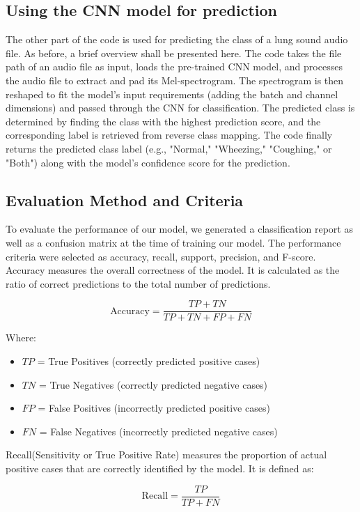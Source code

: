 \documentclass[conference]{IEEEtran}
\begin{document}
{\subsection{Using the CNN model for prediction}
The other part of the code is used for predicting the class of a lung sound audio file. As before, a brief overview shall be presented here.
The code takes the file path of an audio file as input, loads the pre-trained CNN model, and processes the audio file to extract and pad its Mel-spectrogram.
The spectrogram is then reshaped to fit the model's input requirements (adding the batch and channel dimensions) and passed through the CNN for classification.
The predicted class is determined by finding the class with the highest prediction score, and the corresponding label is retrieved from reverse class mapping.
The code finally returns the predicted class label (e.g., "Normal," "Wheezing," "Coughing," or "Both") along with the model's confidence score for the prediction.


\subsection{Evaluation Method and Criteria}
To evaluate the performance of our model, we generated a classification report as well as a confusion matrix at the time of training our model.
The performance criteria were selected as accuracy, recall, support, precision, and F-score.
Accuracy measures the overall correctness of the model. It is calculated as the ratio of correct predictions to the total number of predictions.

\[
\text{Accuracy} = \frac{TP + TN}{TP + TN + FP + FN}
\]

Where:
\begin{itemize}
    \item \( TP \) = True Positives (correctly predicted positive cases)
    \item \( TN \) = True Negatives (correctly predicted negative cases)
    \item \( FP \) = False Positives (incorrectly predicted positive cases)
    \item \( FN \) = False Negatives (incorrectly predicted negative cases)
\end{itemize}

Recall(Sensitivity or True Positive Rate) measures the proportion of actual positive cases that are correctly identified by the model. It is defined as:

\[
\text{Recall} = \frac{TP}{TP + FN}
\]

}
\end{document}
